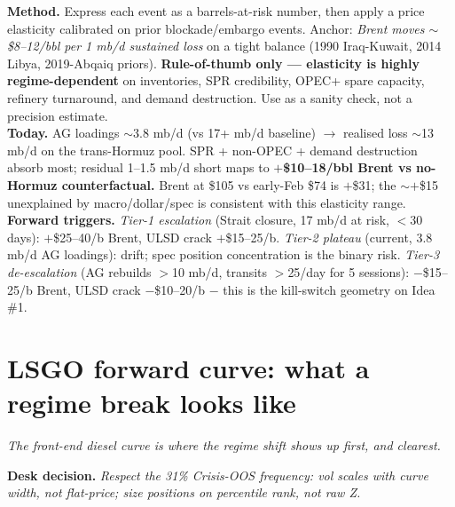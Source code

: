 \documentclass[10pt,a4paper]{article}
\begin{document}
\vspace{0.3cm}
\begin{callout}
\footnotesize
\textbf{Method.} Express each event as a barrels-at-risk number, then apply a price elasticity calibrated on prior blockade/embargo events. Anchor: \emph{Brent moves $\sim$\$8--12/bbl per 1 mb/d sustained loss} on a tight balance (1990 Iraq-Kuwait, 2014 Libya, 2019-Abqaiq priors). \textbf{Rule-of-thumb only --- elasticity is highly regime-dependent} on inventories, SPR credibility, OPEC+ spare capacity, refinery turnaround, and demand destruction. Use as a sanity check, not a precision estimate.\\[2pt]
\textbf{Today.} AG loadings $\sim$3.8 mb/d (vs 17+ mb/d baseline) $\rightarrow$ realised loss $\sim$13 mb/d on the trans-Hormuz pool. SPR + non-OPEC + demand destruction absorb most; residual 1--1.5 mb/d short maps to \textbf{$+$\$10--18/bbl Brent vs no-Hormuz counterfactual.} Brent at \$105 vs early-Feb \$74 is $+$\$31; the $\sim+$\$15 unexplained by macro/dollar/spec is consistent with this elasticity range.\\[2pt]
\textbf{Forward triggers.} \emph{Tier-1 escalation} (Strait closure, 17 mb/d at risk, $<$30 days): $+$\$25--40/b Brent, ULSD crack $+$\$15--25/b. \emph{Tier-2 plateau} (current, 3.8 mb/d AG loadings): drift; spec position concentration is the binary risk. \emph{Tier-3 de-escalation} (AG rebuilds $>$10 mb/d, transits $>$25/day for 5 sessions): $-$\$15--25/b Brent, ULSD crack $-$\$10--20/b $-$ this is the kill-switch geometry on Idea \#1.
\end{callout}

\newpage

\section{LSGO forward curve: what a regime break looks like}\label{sec:3}

\textit{The front-end diesel curve is where the regime shift shows up first, and clearest.}

\noindent\textcolor{obred}{\textbf{Desk decision.}} \emph{Respect the 31\% Crisis-OOS frequency: vol scales with curve width, not flat-price; size positions on percentile rank, not raw Z.}
\end{document}
